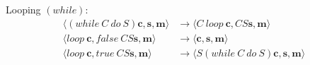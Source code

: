\documentclass[11pt]{report}
\begin{document}
Looping $(while)$:
\begin{align*}
\langle (while\ C\ do\ S)  \bm{c},  \bm{s},  \bm{m} \rangle    &\rightarrow  \langle C\ loop\  \bm{c}, C S  \bm{s},  \bm{m} \rangle \\
\langle loop\  \bm{c}, false\ C S  \bm{s},  \bm{m} \rangle    &\rightarrow   \langle  \bm{c},  \bm{s},  \bm{m} \rangle \\
\langle loop\  \bm{c}, true\  C S  \bm{s},  \bm{m} \rangle    &\rightarrow   \langle S (while\ C\ do\ S)  \bm{c},  \bm{s},  \bm{m} \rangle 
\end{align*}
\end{document}
